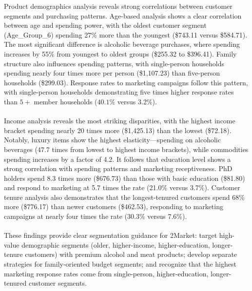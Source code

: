 \documentclass[12pt,a4paper]{article}
\begin{document}
\FloatBarrier
\noindent Product demographics analysis reveals strong correlations between customer segments and purchasing patterns. Age-based analysis shows a clear correlation between age and spending power, with the oldest customer segment (Age\_Group\_6) spending 27\% more than the youngest (\$743.11 versus \$584.71). The most significant difference is alcoholic beverage purchases, where spending increases by 55\% from youngest to oldest groups (\$255.32 to \$396.41). Family structure also influences spending patterns, with single-person households spending nearly four times more per person (\$1,107.23) than five-person households (\$299.03). Response rates to marketing campaigns follow this pattern, with single-person households demonstrating five times higher response rates than $5+$ member households ($40.1\%$  versus 3.2\%).\\
\\
Income analysis reveals the most striking disparities, with the highest income bracket spending nearly 20 times more (\$1,425.13) than the lowest (\$72.18). Notably, luxury items show the highest elasticity—spending on alcoholic beverages (47.7 times from lowest to highest income brackets), while commodities spending increases by a factor of 4.2. It follows that education level shows a strong correlation with spending patterns and marketing receptiveness. PhD holders spend 8.3 times more (\$676.73) than those with basic education (\$81.80) and respond to marketing at 5.7 times the rate (21.0\% versus 3.7\%). Customer tenure analysis also demonstrates that the longest-tenured customers spend 68\% more (\$776.17) than newer customers (\$462.53), responding to marketing campaigns at nearly four times the rate (30.3\% versus 7.6\%).\\
\\
These findings provide clear segmentation guidance for 2Market: target high-value demographic segments (older, higher-income, higher-education, longer-tenure customers) with premium alcohol and meat products; develop separate strategies for family-oriented budget segments; and recognize that the highest marketing response rates come from single-person, higher-education, longer-tenured customer segments.
\clearpage
\newpage
\end{document}
